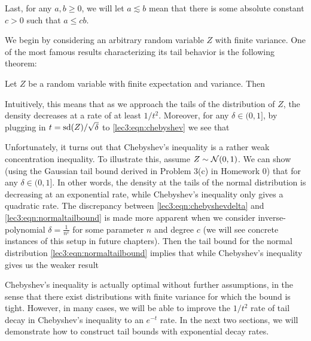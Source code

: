 Last, for any $a, b \geq 0$, we will let $a \lesssim b$ mean that there is some absolute constant $c > 0$ such that $a \leq cb$.

We begin by considering an arbitrary random variable $Z$ with finite variance. One of the most famous results characterizing its tail behavior is the following theorem:

\begin{theorem}
    Let $Z$ be a random variable with finite expectation and variance. Then
\end{theorem}

Intuitively, this means that as we approach the tails of the distribution of $Z$, the density decreases at a rate of at least $1 / t^2$. Moreover, for any $\delta \in (0, 1]$, by plugging in $t = \operatorname{sd}(Z) / \sqrt{\delta}$ to \eqref{lec3:eqn:chebyshev} we see that 
    
Unfortunately, it turns out that Chebyshev's inequality is a rather weak concentration inequality. To illustrate this, assume $Z \sim \mathcal N(0, 1)$. We can show (using the Gaussian tail bound derived in Problem 3(c) in Homework 0) that
for any $\delta \in (0, 1]$. In other words, the density at the tails of the normal distribution is decreasing at an exponential rate, while Chebyshev's inequality only gives a quadratic rate. The discrepancy between \eqref{lec3:eqn:chebyshevdelta} and \eqref{lec3:eqn:normaltailbound} is made more apparent when we consider inverse-polynomial $\delta = \frac{1}{n^c}$ for some parameter $n$ and degree $c$ (we will see concrete instances of this setup in future chapters). Then the tail bound for the normal distribution \eqref{lec3:eqn:normaltailbound} implies that
while Chebyshev's inequality gives us the weaker result

Chebyshev's inequality is actually optimal without further assumptions, in the sense that there exist distributions with finite variance for which the bound is tight. However, in many cases, we will be able to improve the $1/t^2$ rate of tail decay in Chebyshev's inequality to an $e^{-t}$ rate. In the next two sections, we will demonstrate how to construct tail bounds with exponential decay rates.

